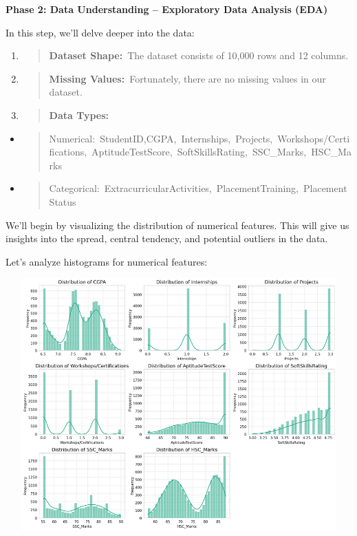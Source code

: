 \documentclass[]{article}
\newcommand{\textcenter}[1]{\begin{center} \vspace{10px}\textbf{\large #1} \end{center}}
\begin{document}
\textcenter{Phase 2: Data Understanding -- Exploratory Data Analysis (EDA)}

In this step, we'll delve deeper into the data:

\begin{enumerate}
\def\labelenumi{\arabic{enumi}.}
\item
  \begin{quote}
  \textbf{Dataset Shape:}~The dataset consists of 10,000 rows and 12
  columns.
  \end{quote}
\item
  \begin{quote}
  \textbf{Missing Values:}~Fortunately, there are no missing values in
  our dataset.
  \end{quote}
\item
  \begin{quote}
  \textbf{Data Types:}
  \end{quote}
\end{enumerate}

\begin{itemize}
\item
  \begin{quote}
  Numerical:~StudentID,CGPA,~Internships,~Projects,~Workshops/Certifications,~AptitudeTestScore,~SoftSkillsRating,~SSC\_Marks,~HSC\_Marks
  \end{quote}
\item
  \begin{quote}
  Categorical:~ExtracurricularActivities,~PlacementTraining,~PlacementStatus
  \end{quote}
\end{itemize}

We'll begin by visualizing the distribution of numerical features. This
will give us insights into the spread, central tendency, and potential
outliers in the data.

Let's analyze histograms for numerical features:

\includegraphics[width=5.26806in,height=3.81458in]{image2.png}
\end{document}
